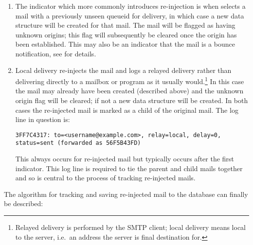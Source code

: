 \begin{enumerate}

    \item The indicator which more commonly introduces re-injection is when
         selects a mail with a previously unseen queueid for
        delivery, in which case a new data structure will be created for
        that mail.  The mail will be flagged as having unknown origins;
        this flag will subsequently be cleared once the origin has been
        established.  This may also be an indicator that the mail is a
        bounce notification, see
         for details.

    \item Local delivery re-injects the mail and logs a relayed delivery
        rather than delivering directly to a mailbox or program as it
        usually would.\footnote{Relayed delivery is performed by the
        \gls{SMTP} client; local delivery means local to the server, i.e.\
        an address the server is final destination for.}  In this case the
        mail may already have been created (described above) and the
        unknown origin flag will be cleared; if not a new data structure
        will be created.  In both cases the re-injected mail is marked as a
        child of the original mail.  The log line in question is:

        \texttt{3FF7C4317: to=<username@example.com>, relay=local,
        \newline{} \tab{} delay=0, status=sent (forwarded as 56F5B43FD)}

        This always occurs for re-injected mail but typically occurs after
        the first indicator.  This log line is required to tie the parent
        and child mails together and so is central to the process of
        tracking re-injected mails.

\end{enumerate}

The algorithm for tracking and saving re-injected mail to the database can
finally be described:

